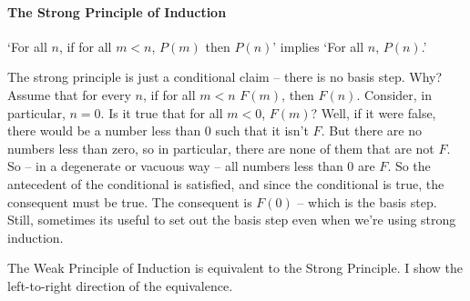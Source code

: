 \paragraph{The Strong Principle of Induction}

\begin{definition} `For all $n$, if for all $m<n$, $P(m)$ then $P(n)$' implies `For
   all $n$, $P(n)$.' \end{definition}

The strong principle is just a conditional claim – there is no basis step. Why? Assume that for every $n$, if for all $m < n$ $F(m)$, then $F(n)$. Consider, in particular, $n=0$. Is it true that for all $m <0$, $F(m)$? Well, if it were false, there would be a number less than $0$ such that it isn't $F$. But there are no numbers less than zero, so in particular, there are none of them that are not $F$. So – in a degenerate or vacuous way – all numbers less than $0$ are $F$. So the antecedent of the conditional is satisfied, and since the conditional is true, the consequent must be true. The consequent is $F(0)$ – which is the basis step. Still, sometimes its useful to set out the basis step even when we're using strong induction.

The Weak Principle of Induction is equivalent to the Strong Principle. I show the left-to-right direction of the equivalence.


